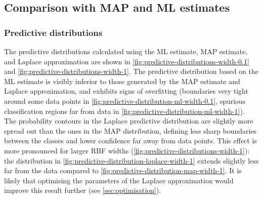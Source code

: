 \documentclass[a4paper]{article}
\begin{document}
    \subsection{Comparison with MAP and ML estimates}
    \subsubsection{Predictive distributions}
    The predictive distributions calculated using the ML estimate, MAP estimate, and Laplace approximation are shown in \autoref{fig:predictive-distributions-width-0.1} and \autoref{fig:predictive-distributions-width-1}.
    The predictive distribution based on the ML estimate is visibly inferior to those generated by the MAP estimate and Laplace approximation, and exhibits signs of overfitting (boundaries very tight around some data points in \autoref{fig:predictive-distribution-ml-width-0.1}, spurious classification regions far from data in \autoref{fig:predictive-distribution-ml-width-1}).
    The probability contours in the Laplace predictive distribution are slightly more spread out than the ones in the MAP distribution, defining less sharp boundaries between the classes and lower confidence far away from data points.
    This effect is more pronounced for larger RBF widths (\autoref{fig:predictive-distributions-width-1}): the distribution in \autoref{fig:predictive-distribution-laplace-width-1} extends slightly less far from the data compared to \autoref{fig:predictive-distribution-map-width-1}.
    It is likely that optimising the parameters of the Laplace approximation would improve this result further (see \autoref{sec:optimisation}).
\end{document}
